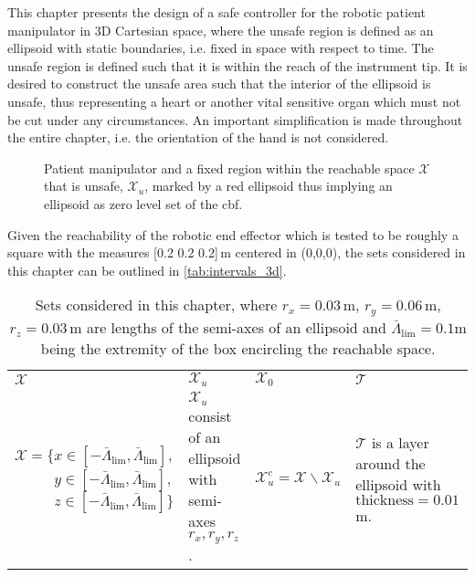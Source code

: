 This chapter presents the design of a safe controller for the  robotic patient manipulator in 3D Cartesian space, where the unsafe region is defined as an ellipsoid with static boundaries, i.e. fixed in space with respect to time. The unsafe region is defined such that it is within the reach of the instrument tip. It is desired to construct the unsafe area such that the interior of the ellipsoid is unsafe, thus representing a heart or another vital sensitive organ which must not be cut under any circumstances. An important simplification is made throughout the entire chapter, i.e. the orientation of the hand is not considered.
\begin{figure}[H]
\centering
{}%
	\hspace*{5mm}
%
\caption{Patient manipulator and a fixed region within the reachable space $\mathcal{X}$ that is unsafe, $\mathcal{X}_u$, marked by a red ellipsoid thus implying an ellipsoid as zero level set of the \gls{cbf}.}
\label{fig:robot_hand_3d}
\end{figure}
Given the reachability of the robotic end effector which is tested to be roughly a square with the measures [0.2 0.2 0.2]\,m centered in (0,0,0), the sets considered in this chapter can be outlined in \autoref{tab:intervals_3d}.
\begin{table}[H]
	\begin{tabularx}{\textwidth}{X X p{2.5cm} X}
\rowcolor{HeaderBlue} 
$\mathcal{X}$ & $\mathcal{X}_u$  & $\mathcal{X}_0$ & $\mathcal{T}$ \\
$\mathcal{X} = \{ x \in  [-\bar{\Lambda}_\text{lim}, \bar{\Lambda}_\text{lim}] $,\newline $ \phantom{\mathcal{X} = \{ } y \in [-\bar{\Lambda}_\text{lim}, \bar{\Lambda}_\text{lim}] $,\newline $\phantom{\mathcal{X} = \{ } z \in  [-\bar{\Lambda}_\text{lim}, \bar{\Lambda}_\text{lim}] \}$ & 
$\mathcal{X}_u$ consist of an ellipsoid with semi-axes $r_x,r_y,r_z$. &  $\mathcal{X}_u^c = \mathcal{X} \backslash \mathcal{X}_u $& $\mathcal{T}$ is a layer around the ellipsoid with $\text{thickness}=0.01\,$m.\\
\end{tabularx}
\caption{Sets considered in this chapter, where $r_x=0.03$\,m, $r_y=0.06$\,m, $r_z=0.03$\,m are lengths of the semi-axes of an ellipsoid and $\bar{\Lambda}_\text{lim}=0.1$m being the extremity of the box encircling the reachable space.}
\label{tab:intervals_3d}
\end{table}
